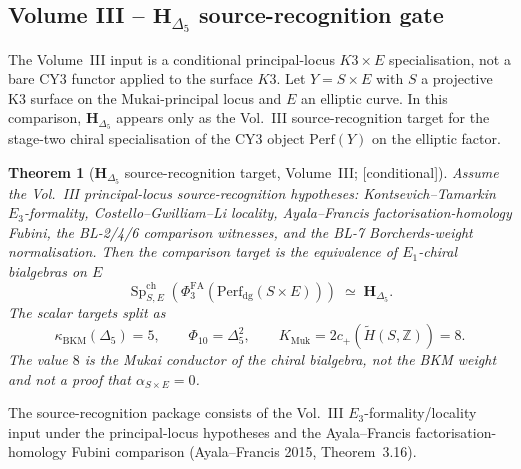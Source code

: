 \documentclass[11pt,reqno]{amsart}
\theoremstyle{plain}
\newtheorem{theorem}{Theorem}[section]
\theoremstyle{definition}
\theoremstyle{remark}
\providecommand{\ClaimStatusConditional}{\textnormal{[conditional]}}
\DeclareMathOperator{\Sp}{Sp}
\newcommand{\Zbb}{\mathbb{Z}}
\newcommand{\bfH}{\mathbf{H}}
\begin{document}
\subsection{Volume III -- $\bfH_{\Delta_5}$ source-recognition gate}
The Volume~III input is a conditional principal-locus
$K3\times E$ specialisation, not a bare CY3 functor applied to the
surface $K3$. Let $Y=S\times E$ with $S$ a projective K3 surface on
the Mukai-principal locus and $E$ an elliptic curve. In this
comparison, $\bfH_{\Delta_5}$ appears only as the Vol.~III
source-recognition target for the stage-two chiral specialisation of
the CY3 object
$\mathrm{Perf}(Y)$ on the elliptic factor.

\begin{theorem}[$\bfH_{\Delta_5}$ source-recognition target, Volume~III; \ClaimStatusConditional]
\label{thm:climax-III}
Assume the Vol.~III principal-locus source-recognition hypotheses:
Kontsevich--Tamarkin $E_3$-formality, Costello--Gwilliam--Li locality,
Ayala--Francis factorisation-homology Fubini, the BL-2/4/6 comparison
witnesses, and the BL-7 Borcherds-weight normalisation. Then the
comparison target is the equivalence of $E_1$-chiral bialgebras on $E$
\[
  \Sp^{\mathrm{ch}}_{S,E}\!\left(\Phi^{\mathrm{FA}}_3
  (\mathrm{Perf}_{\mathrm{dg}}(S\times E))\right)
  \;\simeq\; \bfH_{\Delta_5}.
\]
The scalar targets split as
\[
  \kappa_{\mathrm{BKM}}(\Delta_5)=5,\qquad
  \Phi_{10}=\Delta_5^2,\qquad
  K_{\mathrm{Muk}}=2c_+(\widetilde H(S,\Zbb))=8.
\]
The value $8$ is the Mukai conductor of the chiral bialgebra, not the
BKM weight and not a proof that $\alpha_{S\times E}=0$.
\end{theorem}

The source-recognition package consists of the Vol.~III
$E_3$-formality/locality input under the principal-locus hypotheses
and the Ayala--Francis factorisation-homology Fubini comparison
(Ayala--Francis 2015, Theorem~3.16).
\end{document}
